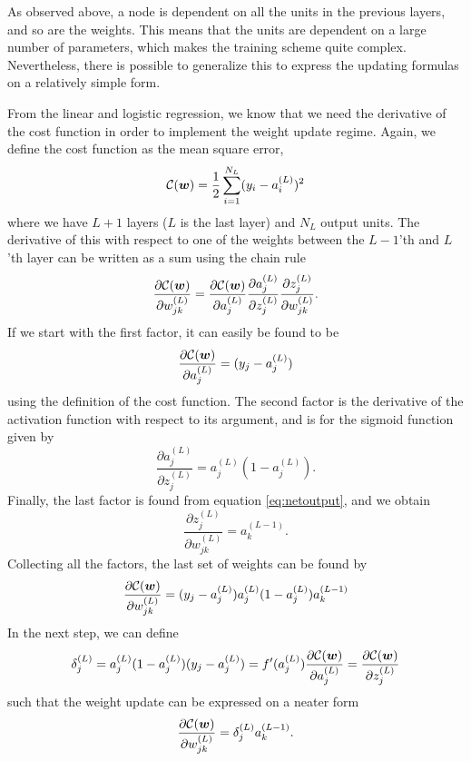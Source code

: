 As observed above, a node is dependent on all the units in the previous layers, and so are the weights. This means that the units are dependent on a large number of parameters, which makes the training scheme quite complex. Nevertheless, there is possible to generalize this to express the updating formulas on a relatively simple form.

From the linear and logistic regression, we know that we need the derivative of the cost function in order to implement the weight update regime. Again, we define the cost function as the mean square error,
\begin{equation*}
\mathcal{C}(\boldsymbol{{w}})=\frac{1}{2}\sum_{i=1}^{N_L}(y_i-a_i^{(L)})^2
\end{equation*}
where we have $L+1$ layers ($L$ is the last layer) and $N_L$ output units. The derivative of this with respect to one of the weights between the $L-1$'th and $L$'th layer can be written as a sum using the chain rule
\begin{equation*}
\frac{\partial\mathcal{C}(\boldsymbol{{w}})}{\partial w_{jk}^{(L)}}=\frac{\partial\mathcal{C}(\boldsymbol{{w}})}{\partial a_j^{(L)}}\frac{\partial a_j^{(L)}}{\partial z_j^{(L)}}\frac{\partial z_j^{(L)}}{\partial w_{jk}^{(L)}}.
\end{equation*}
If we start with the first factor, it can easily be found to be 
\begin{equation*}
\frac{\partial\mathcal{C}(\boldsymbol{{w}})}{\partial a_j^{(L)}}=(y_j-a_j^{(L)})
\end{equation*}
using the definition of the cost function. The second factor is the derivative of the activation function with respect to its argument, and is for the sigmoid function given by
\begin{equation*}
\frac{\partial a_j^{(L)}}{\partial z_j^{(L)}}=a_j^{(L)}(1-a_j^{(L)}).
\end{equation*}
Finally, the last factor is found from equation \eqref{eq:netoutput}, and we obtain
\begin{equation*}
\frac{\partial z_j^{(L)}}{\partial w_{jk}^{(L)}}=a_k^{(L-1)}.
\end{equation*}
Collecting all the factors, the last set of weights can be found by
\begin{equation*}
\frac{\partial\mathcal{C}(\boldsymbol{{w}})}{\partial w_{jk}^{(L)}}=(y_j-a_j^{(L)})a_j^{(L)}(1-a_j^{(L)})a_k^{(L-1)}
\end{equation*}
In the next step, we can define
\begin{equation*}
\delta_j^{(L)}=a_j^{(L)}(1-a_j^{(L)})(y_j-a_j^{(L)})=f'(a_j^{(L)})\frac{\partial \mathcal{C}(\boldsymbol{{w}})}{\partial a_j^{(L)}}=\frac{\partial \mathcal{C}(\boldsymbol{{w}})}{\partial z_j^{(L)}}
\end{equation*}
such that the weight update can be expressed on a neater form
\begin{equation*}
\frac{\partial\mathcal{C}(\boldsymbol{{w}})}{\partial w_{jk}^{(L)}}=\delta_j^{(L)}a_k^{(L-1)}.
\end{equation*}

